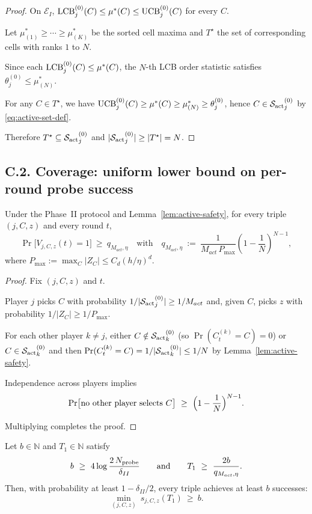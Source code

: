 \begin{proof}
On $\mathcal E_I$, $\operatorname{LCB}^{(0)}_j(C)\le \mu^\ast(C)\le \operatorname{UCB}^{(0)}_j(C)$ for every $C$.

Let $\mu^\ast_{(1)}\ge\cdots\ge \mu^\ast_{(K)}$ be the sorted cell maxima and $T^\star$ the set of corresponding cells with ranks $1$ to $N$.

Since each $\operatorname{LCB}^{(0)}_j(C)\le \mu^\ast(C)$, the $N$-th LCB order statistic satisfies
$\theta^{(0)}_j \le \mu^\ast_{(N)}$.

For any $C\in T^\star$, we have $\operatorname{UCB}^{(0)}_j(C)\ge \mu^\ast(C)\ge \mu^\ast_{(N)}\ge \theta^{(0)}_j$,
hence $C\in {\mathcal{S}_{\mathrm{act}}}^{(0)}_j$ by \eqref{eq:active-set-def}.

Therefore $T^\star\subseteq {\mathcal{S}_{\mathrm{act}}}^{(0)}_j$ and $|{\mathcal{S}_{\mathrm{act}}}^{(0)}_j|\ge |T^\star|=N$.
\end{proof}

\subsection*{C.2.\; Coverage: uniform lower bound on per-round probe success}

\begin{lemma}\label{lem:q-lower}
Under the Phase~II protocol and Lemma~\ref{lem:active-safety}, for every triple $(j,C,z)$ and every round $t$,
\[
\Pr\bigl[V_{j,C,z}(t)=1\bigr]\ \ge\ q_{M_{act},\eta}
\quad\text{with}\quad
q_{M_{act},\eta}\ :=\ \frac{1}{M_{act}\,P_{\max}}\left(1-\frac{1}{N}\right)^{N-1},
\]
where $P_{\max}:=\max_C |Z_C| \le C_d (h/\eta)^d$.
\end{lemma}

\begin{proof}
Fix $(j,C,z)$ and $t$.

Player $j$ picks $C$ with probability $1/|{\mathcal{S}_{\mathrm{act}}}^{(0)}_j|\ge 1/M_{act}$ and, given $C$, picks $z$ with probability $1/|Z_C|\ge 1/P_{\max}$.

For each other player $k\neq j$, either $C\notin {\mathcal{S}_{\mathrm{act}}}^{(0)}_k$ (so $\Pr(C_t^{(k)}=C)=0$) or $C\in {\mathcal{S}_{\mathrm{act}}}^{(0)}_k$ and then
$\Pr(C_t^{(k)}=C)=1/|{\mathcal{S}_{\mathrm{act}}}^{(0)}_k|\le 1/N$ by Lemma~\ref{lem:active-safety}.

Independence across players implies
\[
\Pr\bigl[\text{no other player selects }C\bigr]\ \ge\ \Bigl(1-\frac{1}{N}\Bigr)^{N-1}.
\]

Multiplying completes the proof.
\end{proof}

\begin{lemma}\label{lem:coverage}
Let $b\in\mathbb N$ and $T_1\in\mathbb N$ satisfy
\[
b \ \ge\ 4\log\frac{2\,\NumProbes}{\delta_{II}}
\qquad\text{and}\qquad
T_1 \ \ge\ \frac{2b}{q_{M_{act},\eta}}.
\]
Then, with probability at least $1-\delta_{II}/2$, every triple achieves at least $b$ successes:
\[
\min_{(j,C,z)}\ s_{j,C,z}(T_1)\ \ge\ b.
\]
\end{lemma}

